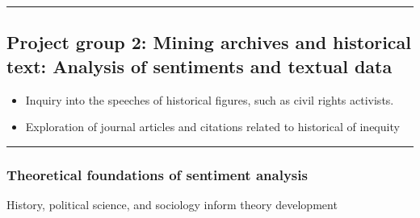 \documentclass[
  letterpaper,
  DIV=11,
  numbers=noendperiod]{scrartcl}
\begin{document}
\begin{center}\rule{0.5\linewidth}{0.5pt}\end{center}

\hypertarget{project-group-2-mining-archives-and-historical-text-analysis-of-sentiments-and-textual-data}{%
\subsection{Project group 2: Mining archives and historical text:
Analysis of sentiments and textual
data}\label{project-group-2-mining-archives-and-historical-text-analysis-of-sentiments-and-textual-data}}

\begin{itemize}
\item
  Inquiry into the speeches of historical figures, such as civil rights
  activists.
\item
  Exploration of journal articles and citations related to historical of
  inequity
\end{itemize}

\begin{center}\rule{0.5\linewidth}{0.5pt}\end{center}

\hypertarget{theoretical-foundations-of-sentiment-analysis}{%
\subsubsection{Theoretical foundations of sentiment
analysis}\label{theoretical-foundations-of-sentiment-analysis}}

History, political science, and sociology inform theory development
\end{document}
